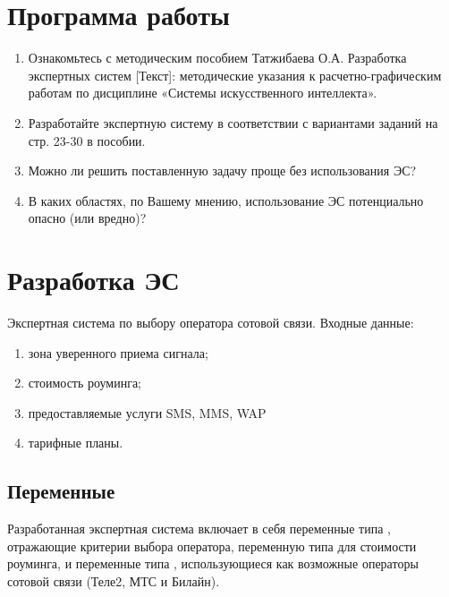 





\tableofcontents
\newpage

\section{Программа работы}

\begin{enumerate}
	\item Ознакомьтесь с методическим пособием Татжибаева О.А. Разработка экспертных систем [Текст]: методические указания к расчетно-графическим работам по дисциплине
	«Системы искусственного интеллекта»\cite{tatj}.
	\item Разработайте экспертную систему в соответствии с вариантами заданий на стр. 23-30 в	пособии.
	\item Можно ли решить поставленную задачу проще без использования ЭС?
	\item В каких областях, по Вашему мнению, использование ЭС потенциально опасно (или вредно)?
\end{enumerate}

\section{Разработка ЭС}

\noindent Экспертная система по выбору оператора сотовой связи. Входные данные:

\begin{enumerate}
	\item зона уверенного приема сигнала;
	\item стоимость роуминга;
	\item предоставляемые услуги SMS, MMS, WAP
	\item тарифные планы.
\end{enumerate}

\subsection{Переменные}

Разработанная экспертная система включает в себя переменные типа , отражающие критерии выбора оператора, переменную типа  для стоимости роуминга, и переменные типа , использующиеся как возможные операторы сотовой связи (Теле2, МТС и Билайн).

